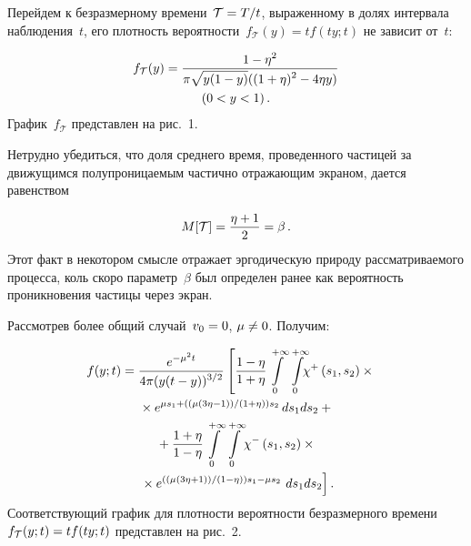 \begin{multicols}{2}
Перейдем к безразмерному времени~$\mathcal {T} \hm= T/t$, выраженному в долях интервала наблюдения~$t$, его плотность вероятности~$f_{\mathcal{T}}(y) = t f(ty; t)$ не зависит от~$t$:

\noindent
\begin{multline}
  \label{eq30}
  f_{\mathcal {T}}(y) = \displaystyle\frac{\displaystyle 1 - \eta ^2\mathstrut}{\displaystyle \pi  \sqrt{y (1 - y)} ((1 + \eta)^2 -4 \eta y)\mathstrut} \\
  (0<y<1)\,.
\end{multline}
График~$f_{\mathcal T}$ представлен на рис.~1.



Нетрудно убедиться, что доля среднего время, проведенного частицей за движущимся полупроницаемым частично отражающим экраном, дается равенством

\noindent
$$
M[\mathcal{T}] = \displaystyle\frac{\displaystyle \eta + 1\mathstrut}{\displaystyle 2\mathstrut} = \beta\,.
 $$
 Этот факт в некотором смысле отражает эргодическую природу рассматриваемого процесса, коль скоро параметр~$\beta$ был определен ранее как вероятность проникновения частицы через экран.

Рассмотрев более общий случай~$v_0 \hm= 0$, $\mu \hm\ne 0$. Получим:

\noindent
\begin{multline*}
\hspace*{-7.21829pt}f(y; t) =\displaystyle\frac{\displaystyle e^{- \mu^2 t}\mathstrut}{\displaystyle 4 \pi (y(t-y))^{3/2}\mathstrut}
   \left[ \displaystyle\frac{\displaystyle 1-\eta\mathstrut}{\displaystyle 1 + \eta\mathstrut} \int\limits_0^{+ \infty} \int\limits_{0}^{+ \infty} \!\!\!\chi^+\left(s_1, s_2\right) \times{}\right.\\
   {}\times e^{\mu s_1 +(({\mu (3 \eta -1)})/({1 + \eta})) s_2}\, ds_1 ds_2 +{} \\
{}  +  \displaystyle\frac{\displaystyle 1 + \eta\mathstrut}{\displaystyle 1 - \eta\mathstrut} \int\limits_0^{+ \infty}
\int\limits_{0}^{+ \infty}\! \chi^-\left(s_1, s_2\right)\times{}\\
\left.{}\times
e^{ (({ \mu (3 \eta +1) })/(1-\eta)) s_1 - \mu  s_2 }\ ds_1 ds_2  \right].
\end{multline*}
Соответствующий график для плотности вероятности безразмерного времени~$f_{\mathcal {T}}(y; t)\hm = t f(ty; t)$ представлен на рис.~2.

\columnbreak

\begin{center}  %
\vspace*{-1pt}
\mbox{%
 \epsfxsize=78.901mm
 }

\end{center}

\vspace*{1pt}


\end{multicols}
